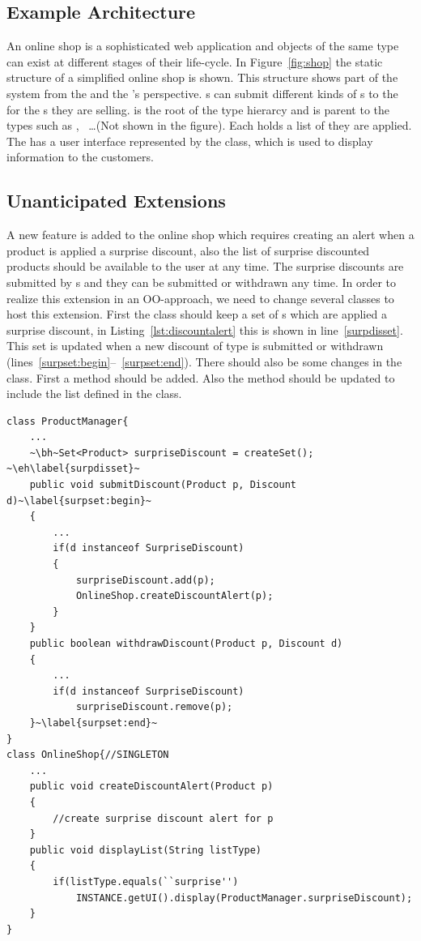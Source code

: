 \subsection{Example Architecture}
An online shop is a sophisticated web application and objects of the same type can exist at different stages of their life-cycle. In Figure~\ref{fig:shop} the static structure of a simplified online shop is shown. This structure shows part of the system from the  and the 's perspective. s can submit different kinds of s to the  for the s they are selling.  is the root of the type hierarcy and is parent to the types such as , ~\dots(Not shown in the figure). Each  holds a list of  they are applied. The  has a user interface represented by the  class, which is used to display information to the customers. 


\subsection{Unanticipated Extensions}
A new feature is added to the online shop which requires creating an alert when a product is applied a surprise discount, also the list of surprise discounted products should be available to the user at any time. The surprise discounts are submitted by s and they can be submitted or withdrawn any time.  In order to realize this extension in an OO-approach, we need to change several classes to host this extension. First the class  should keep a set of s which are applied a surprise discount, in Listing~\ref{lst:discountalert} this is shown in line~\ref{surpdisset}. This set is updated when a new discount of type  is submitted or withdrawn (lines~\ref{surpset:begin}--~\ref{surpset:end}). There should also be some changes in the  class. First a  method should be added. Also the  method should be updated to include the  list defined in the  class.


\begin{lstlisting}[float, caption={A Java implementation of discount alert concern}, label={lst:discountalert}]
class ProductManager{
	...
	~\bh~Set<Product> surpriseDiscount = createSet(); ~\eh\label{surpdisset}~
	public void submitDiscount(Product p, Discount d)~\label{surpset:begin}~
	{
		...
		if(d instanceof SurpriseDiscount)
		{
			surpriseDiscount.add(p);
			OnlineShop.createDiscountAlert(p);
		}
	}
	public boolean withdrawDiscount(Product p, Discount d)
	{
		...
		if(d instanceof SurpriseDiscount)
			surpriseDiscount.remove(p);
	}~\label{surpset:end}~
}
class OnlineShop{//SINGLETON
	...
	public void createDiscountAlert(Product p)
	{
		//create surprise discount alert for p
	}
	public void displayList(String listType)
	{
		if(listType.equals(``surprise'')
			INSTANCE.getUI().display(ProductManager.surpriseDiscount);
	}
}
\end{lstlisting}


